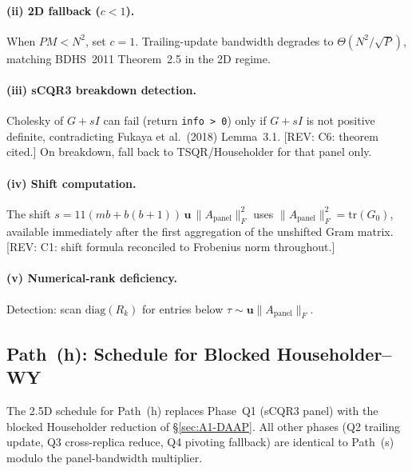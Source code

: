 \documentclass[11pt]{article}
\newcommand{\REV}[1]{\textcolor{blue!60!black}{\small\textsf{[REV: #1]}}}
\begin{document}
\paragraph{(ii) 2D fallback ($c < 1$).}
When $PM < N^2$, set $c = 1$. Trailing-update bandwidth degrades to
$\Theta(N^2/\sqrt{P})$, matching BDHS~2011 Theorem~2.5 in the 2D regime.

\paragraph{(iii) sCQR3 breakdown detection.}
Cholesky of $G + sI$ can fail (return \texttt{info > 0}) only if
$G + sI$ is not positive definite, contradicting Fukaya et al.\ (2018)
Lemma~3.1. \REV{C6: theorem cited.} On breakdown, fall back to
TSQR/Householder for that panel only.

\paragraph{(iv) Shift computation.}
The shift $s = 11(mb + b(b{+}1))\,\mathbf{u}\,\|A_{\mathrm{panel}}\|_F^2$
uses $\|A_{\mathrm{panel}}\|_F^2 = \mathrm{tr}(G_0)$, available
immediately after the first aggregation of the unshifted Gram matrix.
\REV{C1: shift formula reconciled to Frobenius norm throughout.}

\paragraph{(v) Numerical-rank deficiency.}
Detection: scan $\mathrm{diag}(R_k)$ for entries below
$\tau \sim \mathbf{u}\|A_{\mathrm{panel}}\|_F$.

\subsection{Path~(h): Schedule for Blocked Householder--WY}
\label{sec:A3-householder}

The 2.5D schedule for Path~(h) replaces Phase~Q1 (sCQR3 panel) with the
blocked Householder reduction of \S\ref{sec:A1-DAAP}. All other phases
(Q2 trailing update, Q3 cross-replica reduce, Q4 pivoting fallback) are
identical to Path~(s) modulo the panel-bandwidth multiplier.
\end{document}
